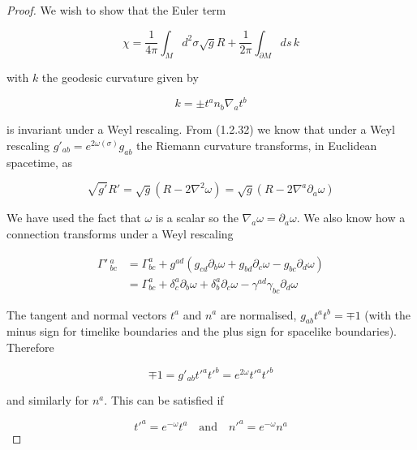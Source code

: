 \begin{tcolorbox}[breakable]
	\begin{proof}
		We wish to show that the Euler term
		
		\begin{equation}
			\chi = \frac{1}{4\pi} \int_M d^2\sigma \sqrt{g}R + \frac{1}{2\pi} \int_{\partial M} ds \, k
		\end{equation}
		
		with \( k \) the geodesic curvature given by
		
		\begin{equation}
			k = \pm t^a n_b \nabla_a t^b
		\end{equation}
		
		is invariant under a Weyl rescaling. From (1.2.32) we know that under a Weyl rescaling \( g'_{ab} = e^{2\omega(\sigma)} g_{ab} \) the Riemann curvature transforms, in Euclidean spacetime, as
		
		\begin{equation}
			\sqrt{g'} R' = \sqrt{g}(R - 2\nabla^2 \omega) = \sqrt{g}(R - 2\nabla^a \partial_a \omega)
		\end{equation}
		
		We have used the fact that \( \omega \) is a scalar so the \( \nabla_a \omega = \partial_a \omega \). We also know how a connection transforms under a Weyl rescaling
		
		\begin{equation}
			\begin{aligned}
				\Gamma'\,^{a}_{bc} &= \Gamma_{bc}^a + g^{ad} (g_{cd} \partial_b \omega + g_{bd} \partial_c \omega - g_{bc} \partial_d \omega) \\
				&= \Gamma_{bc}^a + \delta^a_c \partial_b \omega + \delta^a_b \partial_c \omega - \gamma^{ad} \gamma_{bc} \partial_d \omega
			\end{aligned}
		\end{equation}
		
		The tangent and normal vectors \( t^a \) and \( n^a \) are normalised, \( g_{ab}t^at^b = \mp1 \) (with the minus sign for timelike boundaries and the plus sign for spacelike boundaries). Therefore
		
		\begin{equation}
			\mp1 = g'_{ab}t'^at'^b = e^{2\omega} t'^a t'^b
		\end{equation}
		
		and similarly for \( n^a \). This can be satisfied if
		
		\begin{equation}
			t'^a = e^{-\omega} t^a \quad \text{and} \quad n'^a = e^{-\omega} n^a
		\end{equation}
		

\end{proof}
\end{tcolorbox}
